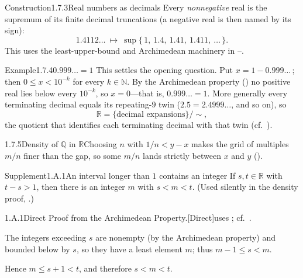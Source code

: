 \documentclass[main.tex]{subfiles}
\begin{document}
\begin{Obj}{Construction}{1.7.3}{Real numbers as decimals}
Every \emph{nonnegative} real is the supremum of its finite decimal truncations (a negative real
is then named by its sign):
\[ 1.4112\ldots\ \longmapsto\ \sup\{\,1,\ 1.4,\ 1.41,\ 1.411,\ \dots\,\}. \]
This uses the least-upper-bound and Archimedean machinery in --.
\end{Obj}

\begin{ObjL}{Example}{1.7.4}{$0.999\ldots=1$}
This settles the opening question. Put $x=1-0.999\ldots\,$; then $0\le x<10^{-k}$ for every
$k\in\mathbb N$. By the Archimedean property () no positive real lies below
every $10^{-k}$, so $x=0$---that is, $0.999\ldots=1$. More generally every terminating decimal equals
its repeating-$9$ twin ($2.5=2.4999\ldots$, and so on), so
\[ \mathbb R=\{\text{decimal expansions}\}\big/\!\sim, \]
the quotient that identifies each terminating decimal with that twin (cf.\ ).
\end{ObjL}

\begin{Fig}{1.7.5}{Density of $\mathbb Q$ in $\mathbb R$}{Choosing $n$ with $1/n<y-x$ makes the grid of multiples $m/n$ finer than the gap, so some $m/n$ lands strictly between $x$ and $y$ ().}
\end{Fig}

\lectureappendix

\begin{ObjL}{Supplement}{1.A.1}{An interval longer than $1$ contains an integer}
If $s,t\in\mathbb R$ with $t-s>1$, then there is an integer $m$ with $s<m<t$. (Used silently in
the density proof, .)
\end{ObjL}
\begin{Prf}{1.A.1}{Direct Proof from the Archimedean Property.}{[Direct]\quad uses ; cf.\ .}
\item The integers exceeding $s$ are nonempty (by the Archimedean property) and bounded below by
  $s$, so they have a least element $m$; thus $m-1\le s<m$.
\item Hence $m\le s+1<t$, and therefore $s<m<t$.
\end{Prf}
\end{document}
